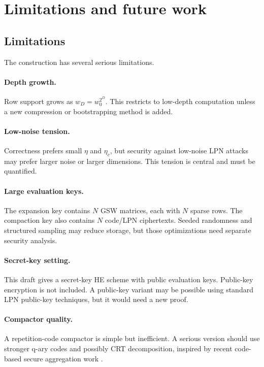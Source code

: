 \section{Limitations and future work}

\subsection{Limitations}

The construction has several serious limitations.

\paragraph{Depth growth.}
Row support grows as $w_D=w_0^{2^D}$.  This restricts \sable{} to low-depth computation unless a new compression or bootstrapping method is added.

\paragraph{Low-noise tension.}
Correctness prefers small $\eta$ and $\eta_c$, but security against low-noise LPN attacks may prefer larger noise or larger dimensions.  This tension is central and must be quantified.

\paragraph{Large evaluation keys.}
The expansion key contains $N$ GSW matrices, each with $N$ sparse rows.  The compaction key also contains $N$ code/LPN ciphertexts.  Seeded randomness and structured sampling may reduce storage, but those optimizations need separate security analysis.

\paragraph{Secret-key setting.}
This draft gives a secret-key HE scheme with public evaluation keys.  Public-key encryption is not included.  A public-key variant may be possible using standard LPN public-key techniques, but it would need a new proof.

\paragraph{Compactor quality.}
A repetition-code compactor is simple but inefficient.  A serious version should use stronger q-ary codes and possibly CRT decomposition, inspired by recent code-based secure aggregation work \cite{BitzerEggerLiuWachterZeh2026}.

